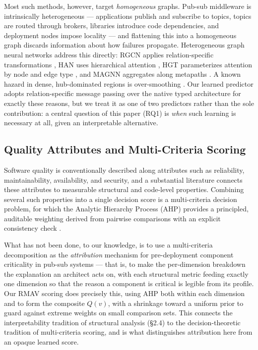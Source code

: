 \documentclass[review]{elsarticle}
\begin{document}
Most such methods, however, target \emph{homogeneous} graphs. Pub-sub middleware is intrinsically
heterogeneous --- applications publish and subscribe to topics, topics are routed through brokers,
libraries introduce code dependencies, and deployment nodes impose locality --- and flattening this
into a homogeneous graph discards information about how failures propagate. Heterogeneous graph
neural networks address this directly: RGCN applies relation-specific transformations
\cite{Schlichtkrull2018RGCN}, HAN uses hierarchical attention \cite{Wang2019HAN}, HGT parameterizes
attention by node and edge type \cite{Hu2020HGT}, and MAGNN aggregates along metapaths
\cite{Fu2020MAGNN}. A known hazard in dense, hub-dominated regions is over-smoothing
\cite{Li2018DeeperInsights}. Our learned predictor adopts relation-specific message passing over the
native typed architecture for exactly these reasons, but we treat it as one of two predictors rather
than the sole contribution: a central question of this paper (RQ1) is \emph{when} such learning is
necessary at all, given an interpretable alternative.

\subsection{Quality Attributes and Multi-Criteria Scoring}

Software quality is conventionally described along attributes such as reliability, maintainability,
availability, and security, and a substantial literature connects these attributes to measurable
structural and code-level properties. Combining several such properties into a single decision score
is a multi-criteria decision problem, for which the Analytic Hierarchy Process (AHP) provides a
principled, auditable weighting derived from pairwise comparisons with an explicit consistency check
\cite{Saaty1980}.

What has not been done, to our knowledge, is to use a multi-criteria decomposition as the
\emph{attribution} mechanism for pre-deployment component criticality in pub-sub systems --- that
is, to make the per-dimension breakdown the explanation an architect acts on, with each structural
metric feeding exactly one dimension so that the reason a component is critical is legible from its
profile. Our RMAV scoring does precisely this, using AHP both within each dimension and to form the
composite $Q(v)$, with a shrinkage toward a uniform prior to guard against extreme weights on small
comparison sets. This connects the interpretability tradition of structural analysis (\S2.4) to the
decision-theoretic tradition of multi-criteria scoring, and is what distinguishes attribution here
from an opaque learned score.
\end{document}
